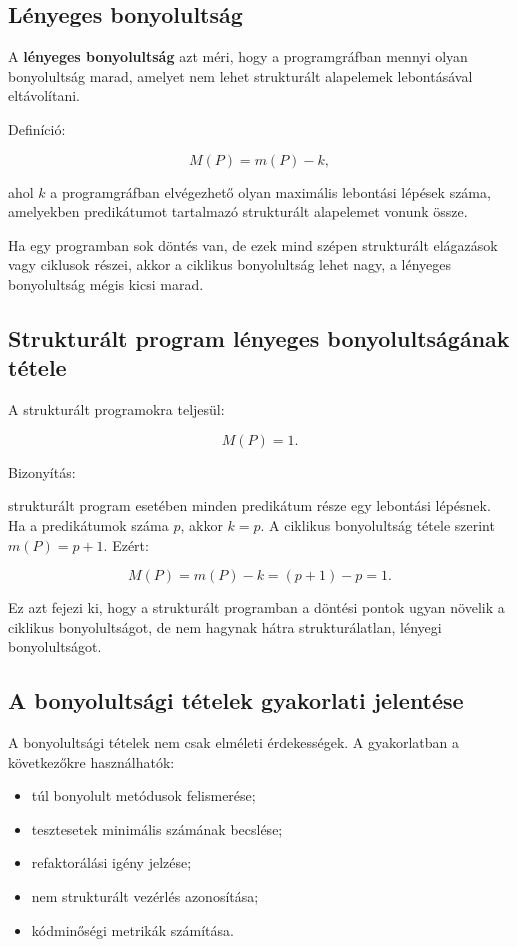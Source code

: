 \subsection{Lényeges bonyolultság}

A \textbf{lényeges bonyolultság} azt méri, hogy a programgráfban mennyi olyan bonyolultság marad, amelyet nem lehet strukturált alapelemek lebontásával eltávolítani.

Definíció:

\[
M(P)=m(P)-k,
\]

ahol $k$ a programgráfban elvégezhető olyan maximális lebontási lépések száma, amelyekben predikátumot tartalmazó strukturált alapelemet vonunk össze.

Ha egy programban sok döntés van, de ezek mind szépen strukturált elágazások vagy ciklusok részei, akkor a ciklikus bonyolultság lehet nagy, a lényeges bonyolultság mégis kicsi marad.

\subsection{Strukturált program lényeges bonyolultságának tétele}

A strukturált programokra teljesül:

\[
M(P)=1.
\]

Bizonyítás:

strukturált program esetében minden predikátum része egy lebontási lépésnek. Ha a predikátumok száma $p$, akkor $k=p$. A ciklikus bonyolultság tétele szerint $m(P)=p+1$. Ezért:

\[
M(P)=m(P)-k=(p+1)-p=1.
\]

Ez azt fejezi ki, hogy a strukturált programban a döntési pontok ugyan növelik a ciklikus bonyolultságot, de nem hagynak hátra strukturálatlan, lényegi bonyolultságot.

\subsection{A bonyolultsági tételek gyakorlati jelentése}

A bonyolultsági tételek nem csak elméleti érdekességek. A gyakorlatban a következőkre használhatók:

\begin{itemize}
  \item túl bonyolult metódusok felismerése;
  \item tesztesetek minimális számának becslése;
  \item refaktorálási igény jelzése;
  \item nem strukturált vezérlés azonosítása;
  \item kódminőségi metrikák számítása.
\end{itemize}

